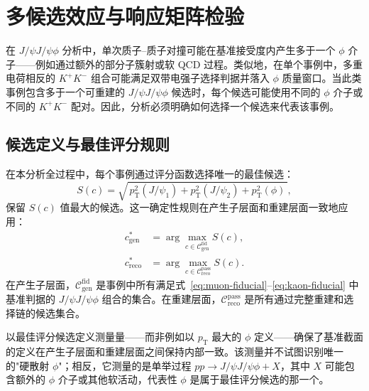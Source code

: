 \chapter{多候选效应与响应矩阵检验}
\label{app:multicandidate}

在 $J/\psi J/\psi \phi$ 分析中，单次质子--质子对撞可能在基准接受度内产生多于一个 $\phi$ 介子——例如通过额外的部分子簇射或软 QCD 过程。类似地，在单个事例中，多重电荷相反的 $K^+K^-$ 组合可能满足双带电强子选择判据并落入 $\phi$ 质量窗口。当此类事例包含多于一个可重建的 $J/\psi J/\psi \phi$ 候选时，每个候选可能使用不同的 $\phi$ 介子或不同的 $K^+K^-$ 配对。因此，分析必须明确如何选择一个候选来代表该事例。

\section{候选定义与最佳评分规则}
\label{sec:candidate-definition}

在本分析全过程中，每个事例通过评分函数选择唯一的最佳候选：
\begin{equation}
S(c) = \sqrt{\,p_{\mathrm T}^2(J/\psi_1) + p_{\mathrm T}^2(J/\psi_2) + p_{\mathrm T}^2(\phi)\,},
\label{eq:score}
\end{equation}
保留 $S(c)$ 值最大的候选。这一确定性规则在产生子层面和重建层面一致地应用：
\begin{align}
c_{\mathrm{gen}}^{*} &= \arg\max_{c \in \mathcal{C}_{\mathrm{gen}}^{\mathrm{fid}}} S(c), \label{eq:gen-best} \\
c_{\mathrm{reco}}^{*} &= \arg\max_{c \in \mathcal{C}_{\mathrm{reco}}^{\mathrm{pass}}} S(c). \label{eq:reco-best}
\end{align}
在产生子层面，$\mathcal{C}_{\mathrm{gen}}^{\mathrm{fid}}$ 是事例中所有满足式~\eqref{eq:muon-fiducial}--\eqref{eq:kaon-fiducial} 中基准判据的 $J/\psi J/\psi \phi$ 组合的集合。在重建层面，$\mathcal{C}_{\mathrm{reco}}^{\mathrm{pass}}$ 是所有通过完整重建和选择链的候选集合。

以最佳评分候选定义测量量——而非例如以 $p_{\mathrm T}$ 最大的 $\phi$ 定义——确保了基准截面的定义在产生子层面和重建层面之间保持内部一致。该测量并不试图识别唯一的"硬散射 $\phi$"；相反，它测量的是单举过程 $pp \to J/\psi J/\psi \phi + X$，其中 $X$ 可能包含额外的 $\phi$ 介子或其他软活动，代表性 $\phi$ 是属于最佳评分候选的那一个。

